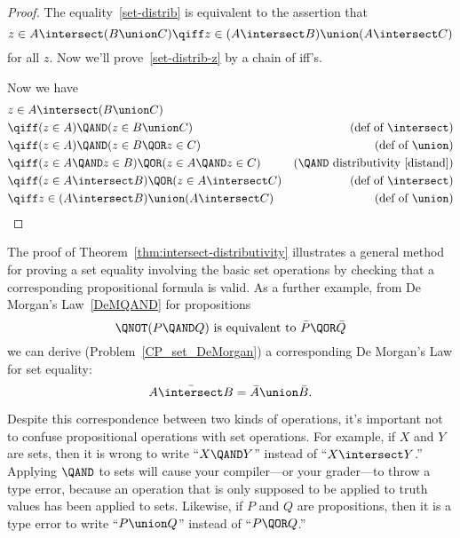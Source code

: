 \begin{proof}
The equality~\eqref{set-distrib} is equivalent to the assertion that
\begin{equation}\label{set-distrib-z}
  z \in A \intersect (B \union C) \qiff z \in (A \intersect B)
  \union (A \intersect C)
\end{equation}
for all $z$.  Now we'll prove~\eqref{set-distrib-z} by a chain of iff's.

Now we have
\begin{align*}
\lefteqn{z \in A \intersect (B \union C)}\\
& \qiff (z \in A) \QAND (z \in B \union C) & \text{(def of $\intersect$)}\\
& \qiff (z \in A) \QAND (z \in B \QOR z \in C)
                & \text{(def of $\union$)}\\
& \qiff (z \in A \QAND z \in B) \QOR (z \in A \QAND z \in C)
                & \text{(\QAND\ distributivity~\eqref{distand})}\\
& \qiff (z \in A \intersect B) \QOR (z \in A \intersect C)
                & \text{(def of $\intersect$)}\\
& \qiff z \in (A \intersect B) \union (A \intersect C)
                & \text{(def of $\union$)}
\end{align*}

\end{proof}
  
The proof of Theorem~\ref{thm:intersect-distributivity} illustrates a
general method for proving a set equality involving the basic set
operations by checking that a corresponding propositional formula is
valid.  As a further example, from De Morgan's Law~\eqref{DeMQAND} for
propositions
\[
\QNOT(P \QAND Q)  \text{  is equivalent to  } \bar{P} \QOR \bar{Q}
\]
we can derive (Problem~\ref{CP_set_DeMorgan}) a corresponding De
Morgan's Law for set equality:
\begin{equation}\label{set-demorgan}
\bar{A \intersect B} = \bar{A} \union \bar{B}.
\end{equation}

Despite this correspondence between two kinds of operations, it's
important not to confuse propositional operations with set operations.
For example, if $X$ and $Y$ are sets, then it is wrong to write ``$X
\QAND Y$'' instead of ``$X \intersect Y$.''  Applying $\QAND$ to sets
will cause your compiler---or your grader---to throw a type error,
because an operation that is only supposed to be applied to truth
values has been applied to sets.  Likewise, if $P$ and $Q$ are
propositions, then it is a type error to write ``$P \union Q$''
instead of ``$P \QOR Q$.''


